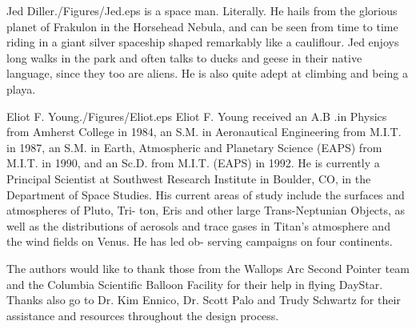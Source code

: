 \documentclass[twocolumn,letterpaper]{IEEEAerospace2012}
\newcommand{\rootdir}{./Figures/}
\begin{document}
\begin{biographywithpic}{Jed Diller}{\rootdir Jed.eps}
is a space man. Literally. He hails from the glorious planet of Frakulon in the Horsehead Nebula, and can be seen from time to time riding in a giant silver spaceship shaped remarkably like a cauliflour. Jed enjoys long walks in the park and often talks to ducks and geese in their native language, since they too are aliens. He is also quite adept at climbing and being a playa.
\end{biographywithpic}

\begin{biographywithpic}{Eliot F. Young}{\rootdir Eliot.eps}
Eliot F. Young received an A.B .in
Physics from Amherst College in 1984,
an S.M. in Aeronautical Engineering
from M.I.T. in 1987, an S.M. in Earth,
Atmospheric and Planetary Science
(EAPS) from M.I.T. in 1990, and an
Sc.D. from M.I.T. (EAPS) in 1992. He is
currently a Principal Scientist at
Southwest Research Institute in Boulder,
CO, in the Department of Space Studies. His current areas
of study include the surfaces and atmospheres of Pluto, Tri-
ton, Eris and other large Trans-Neptunian Objects, as well
as the distributions of aerosols and trace gases in Titan's
atmosphere and the wind fields on Venus. He has led ob-
serving campaigns on four continents.
\end{biographywithpic}

\acknowledgments
The authors would like to thank those from the Wallops Arc Second Pointer team and the Columbia Scientific Balloon Facility for their help in flying DayStar. Thanks also go to Dr. Kim Ennico, Dr. Scott Palo and Trudy Schwartz for their assistance and resources throughout the design process. 
\end{document}
